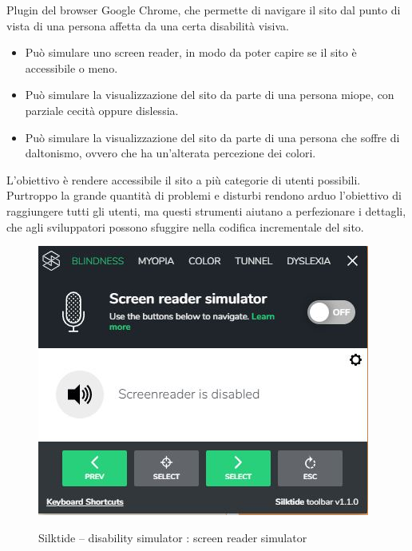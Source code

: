 Plugin del browser Google Chrome, che permette di navigare il sito dal punto di vista di una persona affetta da una certa disabilità visiva.\\
\begin{itemize}
	\item Può simulare uno screen reader, in modo da poter capire se il sito è accessibile o meno.
	\item Può simulare la visualizzazione del sito da parte di una persona miope, con parziale cecità oppure dislessia.
	\item Può simulare la visualizzazione del sito da parte di una persona che soffre di daltonismo, ovvero che ha un'alterata percezione dei colori.
\end{itemize}
L'obiettivo è rendere accessibile il sito a più categorie di utenti possibili. Purtroppo la grande quantità di problemi e disturbi rendono arduo l'obiettivo di raggiungere tutti gli utenti, ma questi strumenti aiutano a perfezionare i dettagli, che agli sviluppatori possono sfuggire nella codifica incrementale del sito.
\begin{figure}[!h]
	\centering
	\includegraphics[width=0.7\linewidth]{sezioni/FaseTest/Immagini/screen_reader_simulator.JPG}\\
	\caption{Silktide – disability simulator : screen reader simulator}
	\label{Fig:silktide}
\end{figure} 
